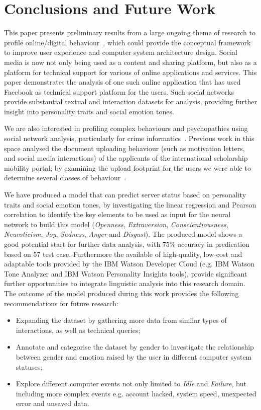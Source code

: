 \documentclass[graybox]{svmult}
\begin{document}
{{{\section{Conclusions and Future Work}\label{conclusions}

This paper presents preliminary results from a large ongoing theme of
research to profile online/digital
behaviour~\citep{oatley+crick:2014,oatley-et-al_dasc2015}, which could
provide the conceptual framework to improve user experience and
computer system architecture design. Social media is now not only
being used as a content and sharing platform, but also as a platform
for technical support for various of online applications and
services. This paper demonstrates the analysis of one such online
application that has used Facebook as technical support platform for
the users. Such social networks provide substantial textual and
interaction datasets for analysis, providing further insight into
personality traits and social emotion tones.

We are also interested in profiling complex behaviours and
psychopathies using social network analysis, particularly for crime
informatics~\cite{oatley+crick:2015}. Previous work in this space
analysed the document uploading behaviour (such as motivation letters,
and social media interactions) of the applicants of the international
scholarship mobility portal; by examining the upload footprint for the
users we were able to determine several classes of
behaviour~\citep{oatley-et-al-soccogcomp2015}.

We have produced a model that can predict server status based on
personality traits and social emotion tones, by investigating the
linear regression and Pearson correlation to identify the key elements
to be used as input for the neural network to build this model
({\emph{Openness}}, {\emph{Extraversion}}, {\emph{Conscientiousness}},
{\emph{Neuroticism}}, {\emph{Joy}}, {\emph{Sadness}}, {\emph{Anger}}
and {\emph{Disgust}}). The produced model shows a good potential start
for further data analysis, with 75\% accuracy in predication based on
57 test case. Furthermore the available of high-quality, low-cost and
adaptable tools provided by the IBM Watson Developer Cloud (e.g. IBM
Watson Tone Analyzer and IBM Watson Personality Insights tools),
provide significant further opportunities to integrate linguistic
analysis into this research domain. The outcome of the model produced
during this work provides the following recommendations for future
research:

\begin{itemize}
\item Expanding the dataset by gathering more data from similar types
  of interactions, as well as technical queries;
\item Annotate and categorise the dataset by gender to investigate the relationship
  between gender and emotion raised by the user in different computer
  system statuses;
\item Explore different computer events not only limited to
  {\emph{Idle}} and {\emph{Failure}}, but including more complex events
      e.g. account hacked, system speed, unexpected error and unsaved data.
\end{itemize}


}}}
\end{document}

